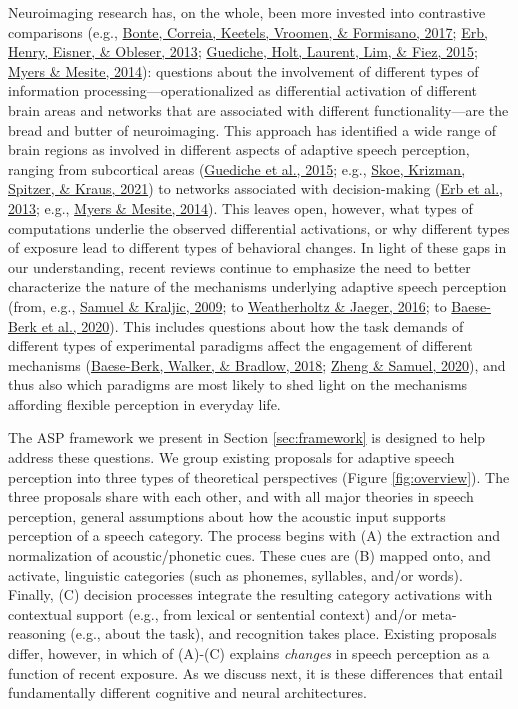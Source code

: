 \documentclass[
  11pt,
  english,
  man,floatsintext]{apa6}
\begin{document}
Neuroimaging research has, on the whole, been more invested into contrastive comparisons (e.g., \protect\hyperlink{ref-bonte2017}{Bonte, Correia, Keetels, Vroomen, \& Formisano, 2017}; \protect\hyperlink{ref-erb2013brain}{Erb, Henry, Eisner, \& Obleser, 2013}; \protect\hyperlink{ref-guediche2015evidence}{Guediche, Holt, Laurent, Lim, \& Fiez, 2015}; \protect\hyperlink{ref-myers-mesite2014}{Myers \& Mesite, 2014}): questions about the involvement of different types of information processing---operationalized as differential activation of different brain areas and networks that are associated with different functionality---are the bread and butter of neuroimaging. This approach has identified a wide range of brain regions as involved in different aspects of adaptive speech perception, ranging from subcortical areas (\protect\hyperlink{ref-guediche2015evidence}{Guediche et al., 2015}; e.g., \protect\hyperlink{ref-skoe2021auditory}{Skoe, Krizman, Spitzer, \& Kraus, 2021}) to networks associated with decision-making (\protect\hyperlink{ref-erb2013brain}{Erb et al., 2013}; e.g., \protect\hyperlink{ref-myers-mesite2014}{Myers \& Mesite, 2014}). This leaves open, however, what types of computations underlie the observed differential activations, or why different types of exposure lead to different types of behavioral changes. In light of these gaps in our understanding, recent reviews continue to emphasize the need to better characterize the nature of the mechanisms underlying adaptive speech perception (from, e.g., \protect\hyperlink{ref-samuel-kraljic2009}{Samuel \& Kraljic, 2009}; to \protect\hyperlink{ref-weatherholtz-jaeger2016}{Weatherholtz \& Jaeger, 2016}; to \protect\hyperlink{ref-baeseberk2020}{Baese-Berk et al., 2020}). This includes questions about how the task demands of different types of experimental paradigms affect the engagement of different mechanisms (\protect\hyperlink{ref-baeseberk2018}{Baese-Berk, Walker, \& Bradlow, 2018}; \protect\hyperlink{ref-zheng-samuel2020}{Zheng \& Samuel, 2020}), and thus also which paradigms are most likely to shed light on the mechanisms affording flexible perception in everyday life.

The ASP framework we present in Section \ref{sec:framework} is designed to help address these questions. We group existing proposals for adaptive speech perception into three types of theoretical perspectives (Figure \ref{fig:overview}). The three proposals share with each other, and with all major theories in speech perception, general assumptions about how the acoustic input supports perception of a speech category. The process begins with (A) the extraction and normalization of acoustic/phonetic cues. These cues are (B) mapped onto, and activate, linguistic categories (such as phonemes, syllables, and/or words). Finally, (C) decision processes integrate the resulting category activations with contextual support (e.g., from lexical or sentential context) and/or meta-reasoning (e.g., about the task), and recognition takes place. Existing proposals differ, however, in which of (A)-(C) explains \emph{changes} in speech perception as a function of recent exposure. As we discuss next, it is these differences that entail fundamentally different cognitive and neural architectures.
\end{document}
